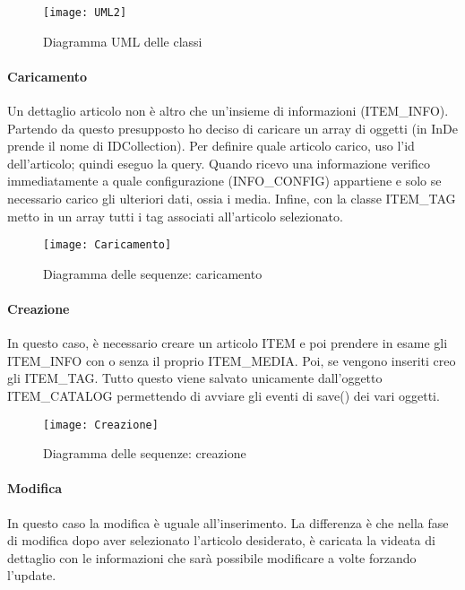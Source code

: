 \begin{figure}[!h] 
	\centering 
	\texttt{[image: UML2]} 
	\caption{Diagramma UML delle classi}
	\label{UML}
\end{figure}

\paragraph{Caricamento}
Un dettaglio articolo non è altro che un'insieme di informazioni (ITEM\_INFO). Partendo da questo presupposto ho deciso di caricare un array di oggetti (in InDe prende il nome di IDCollection).
Per definire quale articolo carico, uso l'id dell'articolo; quindi eseguo la query. Quando ricevo una informazione verifico immediatamente a quale configurazione (INFO\_CONFIG) appartiene e solo se necessario carico gli ulteriori dati, ossia i media. Infine, con la classe ITEM\_TAG metto in un array tutti i tag associati all'articolo selezionato.

\begin{figure}[!h] 
	\centering 
	\texttt{[image: Caricamento]} 
	\caption{Diagramma delle sequenze: caricamento}
	\label{DS:caricamento}
\end{figure}

\paragraph{Creazione}
In questo caso, è necessario creare un articolo ITEM e poi prendere in esame gli ITEM\_INFO con o senza il proprio ITEM\_MEDIA. Poi, se vengono inseriti creo gli ITEM\_TAG. Tutto questo viene salvato unicamente dall'oggetto ITEM\_CATALOG permettendo di avviare gli eventi di save() dei vari oggetti.

\begin{figure}[!h] 
	\centering 
	\texttt{[image: Creazione]} 
	\caption{Diagramma delle sequenze: creazione}
	\label{DS:creazione}
\end{figure}

\paragraph{Modifica}
In questo caso la modifica è uguale all'inserimento. La differenza è che nella fase di modifica dopo aver selezionato l'articolo desiderato, è caricata la videata di dettaglio con le informazioni che sarà possibile modificare a volte forzando l'update.


